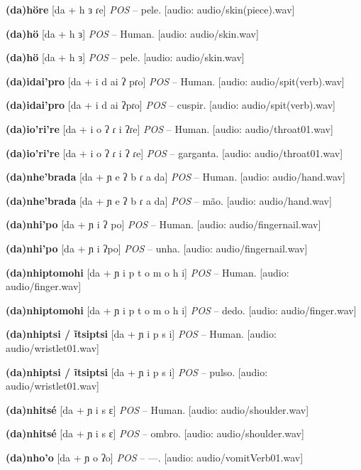 \textbf{(da)höre} [da + h ɜ ɾe] \textit{POS} -- pele. [audio: audio/skin(piece).wav]{\faHeadphones}

\textbf{(da)hö} [da + h ɜ] \textit{POS} -- Human. [audio: audio/skin.wav]{\faHeadphones}

\textbf{(da)hö} [da + h ɜ] \textit{POS} -- pele. [audio: audio/skin.wav]{\faHeadphones}

\textbf{(da)idai'pro} [da + i d ai ʔ pɾo] \textit{POS} -- Human. [audio: audio/spit(verb).wav]{\faHeadphones}

\textbf{(da)idai'pro} [da + i d ai ʔpɾo] \textit{POS} -- cuspir. [audio: audio/spit(verb).wav]{\faHeadphones}

\textbf{(da)io'ri're} [da + i o ʔ ɾ i ʔɾe] \textit{POS} -- Human. [audio: audio/throat01.wav]{\faHeadphones}

\textbf{(da)io'ri're} [da + i o ʔ ɾ i ʔ ɾe] \textit{POS} -- garganta. [audio: audio/throat01.wav]{\faHeadphones}

\textbf{(da)nhe'brada} [da + ɲ e ʔ b ɾ a da] \textit{POS} -- Human. [audio: audio/hand.wav]{\faHeadphones}

\textbf{(da)nhe'brada} [da + ɲ e ʔ b ɾ a da] \textit{POS} -- mão. [audio: audio/hand.wav]{\faHeadphones}

\textbf{(da)nhi'po} [da + ɲ i ʔ po] \textit{POS} -- Human. [audio: audio/fingernail.wav]{\faHeadphones}

\textbf{(da)nhi'po} [da + ɲ i ʔpo] \textit{POS} -- unha. [audio: audio/fingernail.wav]{\faHeadphones}

\textbf{(da)nhiptomohi} [da + ɲ i p t o m o h i] \textit{POS} -- Human. [audio: audio/finger.wav]{\faHeadphones}

\textbf{(da)nhiptomohi} [da + ɲ i p t o m o h i] \textit{POS} -- dedo. [audio: audio/finger.wav]{\faHeadphones}

\textbf{(da)nhiptsi / ĩtsiptsi} [da + ɲ i p s i] \textit{POS} -- Human. [audio: audio/wristlet01.wav]{\faHeadphones}

\textbf{(da)nhiptsi / ĩtsiptsi} [da + ɲ i p s i] \textit{POS} -- pulso. [audio: audio/wristlet01.wav]{\faHeadphones}

\textbf{(da)nhitsé} [da + ɲ i s ɛ] \textit{POS} -- Human. [audio: audio/shoulder.wav]{\faHeadphones}

\textbf{(da)nhitsé} [da + ɲ i s ɛ] \textit{POS} -- ombro. [audio: audio/shoulder.wav]{\faHeadphones}

\textbf{(da)nho'o} [da + ɲ o ʔo] \textit{POS} -- —. [audio: audio/vomitVerb01.wav]{\faHeadphones}

